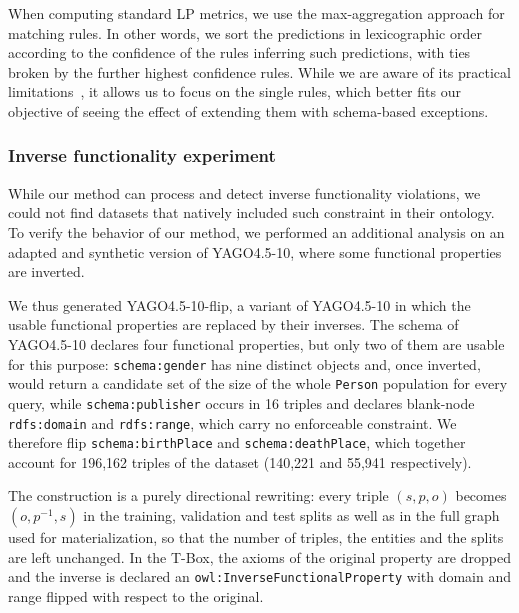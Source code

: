 \documentclass[a4paper,UKenglish,cleveref, autoref, thm-restate]{tgdk-v2021}
\begin{document}
\noindent When computing standard LP metrics, we use the max-aggregation approach for matching rules. In other words, we sort the predictions in lexicographic order according to the confidence of the rules inferring such predictions, with ties broken by the further highest confidence rules. While we are aware of its practical limitations~\cite{ott_rule-based_2023,ott_safran_2021}, it allows us to focus on the single rules, which better fits our objective of seeing the effect of extending them with schema-based exceptions.

\subsubsection{Inverse functionality experiment}\label{sec:flip}
While our method can process and detect inverse functionality violations, we could not find datasets that natively included such constraint in their ontology. To verify the behavior of our method, we performed an additional analysis on an adapted and synthetic version of YAGO4.5-10, where some functional properties are inverted.

We thus generated YAGO4.5-10-flip, a variant of YAGO4.5-10 in which the usable functional properties are replaced by their inverses. The schema of YAGO4.5-10 declares four functional properties, but only two of them are usable for this purpose: \texttt{schema:gender} has nine distinct objects and, once inverted, would return a candidate set of the size of the whole \texttt{Person} population for every query, while \texttt{schema:publisher} occurs in 16 triples and declares blank-node \texttt{rdfs:domain} and \texttt{rdfs:range}, which carry no enforceable constraint. We therefore flip \texttt{schema:birthPlace} and \texttt{schema:deathPlace}, which together account for 196,162 triples of the dataset (140,221 and 55,941 respectively).

The construction is a purely directional rewriting: every triple $(s,p,o)$ becomes $(o,p^{-1},s)$ in the training, validation and test splits as well as in the full graph used for materialization, so that the number of triples, the entities and the splits are left unchanged. 
In the T-Box, the axioms of the original property are dropped and the inverse is declared an \texttt{owl:InverseFunctionalProperty} with domain and range flipped with respect to the original.
\end{document}
